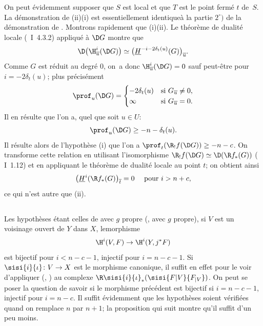 On peut \'evidemment supposer que $S$ est local et que $T$ est le point ferm\'e $t$ de~$S$. La d\'emonstration de \textup{(ii)}\ALORS\textup{(i)} est essentiellement identique\pageoriginale \`a la partie $2^\circ)$ de la d\'emonstration de . Montrons rapidement que \textup{(i)}\ALORS \textup{(ii)}. Le th\'eor\`eme de dualit\'e locale (~I~4.3.2) appliqu\'e \`a $\D G$ montre que
$$
\D\big(\H_{\overline{u}}^{i}(\D G)\big) \simeq\big(\underline{H}^{-i-2\delta_{t}(u)}(G)\big)_{\overline{u}}.
$$
Comme $G$ est r\'eduit au degr\'e $0$, on~a donc $\H_{\overline{u}}^{i}(\D G)=0$ sauf peut-\^etre pour $i=-2\delta_{t}(u)$; plus pr\'ecis\'ement
{\[
\prof_{u}(\D G)=
\begin{cases}
-2\delta_{t}(u) &\text{si } G_{\overline{u}}\neq 0, \\
\infty &\text{si } G_{\overline{u}}=0.
\end{cases}
\]}
Il en r\'esulte que l'on a, quel que soit $u\in U$:
$$
\prof_{u}(\D G)\geq -n-\delta_{t}(u).
$$
Il r\'esulte alors de l'hypoth\`ese \textup{(i)} que l'on a $\prof_{t}(\R_{!}f(\D G))\geq -n-c$. On transforme cette relation en utilisant l'isomorphisme $\R_{!}f(\D G)\simeq\D(\R f_{\ast}(G))$ ( I~1.12) et en appliquant le th\'eor\`eme de dualit\'e locale au point $t$; on obtient ainsi
$$
\big(\underline{H}^{i}(\R f_{\ast}(G)\big)_{\overline{t}}=0\quad\textrm{ pour }i>n+c,
$$
ce qui n'est autre que \textup{(ii)}.

\subsection{} \label{XIV.4.8} Les hypoth\`eses \'etant celles de  avec $g$ propre (\resp {}, \resp {} avec $g$ propre), si $V$ est un voisinage ouvert de $Y$ dans $X$, le\pageoriginaled morphisme
$$
\H^{i}(V, F)\to\H^{i}(Y, j^{\ast}F)$$
est bijectif pour $i<n-c-1$, injectif pour $i=n-c-1$. Si $\sisi{i}{\iota}\colon V\to X$ est le morphisme canonique, il suffit en effet pour le voir d'appliquer  (\resp {}, \resp {}) au complexe $\R \sisi{i}{\iota}_{\ast}(\sisi{F{|V}}{F_{|V}})$. On peut se poser la question de savoir si le morphisme pr\'ec\'edent est bijectif si $i=n-c-1$, injectif pour $i=n-c$. Il suffit \'evidemment que les hypoth\`eses soient v\'erifi\'ees quand on remplace $n$ par $n+1$; la proposition qui suit montre qu'il suffit d'un peu moins.

